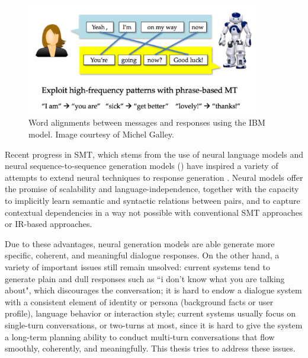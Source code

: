 \begin{figure}
\center
\includegraphics[width=4in]{img/michel.png}
\caption[Word alignments between   messages and responses using the IBM model]{Word alignments between   messages and responses using the IBM model. Image courtesy of Michel Galley.}
\label{IBM}
\end{figure}
Recent progress in SMT, which stems  from the use of neural 
language models \cite{mikolov2010recurrent,kalchbrenner2013recurrent,vaswani2013decoding} and neural sequence-to-sequence generation models (\sts) \cite{sutskever2014sequence,bahdanau2014neural,cho2014learning,luong2015effective,luong2014addressing,luong2016achieving}
have inspired a
variety of
attempts to extend neural
techniques to response generation \cite{sordoni2015neural,ghazvininejad2017knowledge,mostafazadeh2017image,serban2017hierarchical,serban2016building,serban2016generative,serban2017multiresolution}. 
Neural models offer the promise of scalability
and language-independence, together with the
capacity to implicitly learn semantic and syntactic
relations between pairs, and to capture contextual dependencies
in a way not possible
with conventional SMT approaches or IR-based approaches.

Due to these advantages, neural generation models are able generate more specific, coherent, and meaningful dialogue responses. 
On the other hand, 
a variety of important issues still remain unsolved: current  systems tend to generate plain and dull responses such as ``i don't know what you are talking about", which discourages the conversation; it is hard to endow a dialogue system with a consistent 
element of identity or persona (background facts or user
profile), language behavior or interaction style;
current systems usually focus on single-turn conversations, or two-turns at most, since
it is hard to give the system a long-term planning ability 
to conduct 
 multi-turn conversations that flow smoothly, coherently, and meaningfully.  
This thesis tries to address these issues. 



